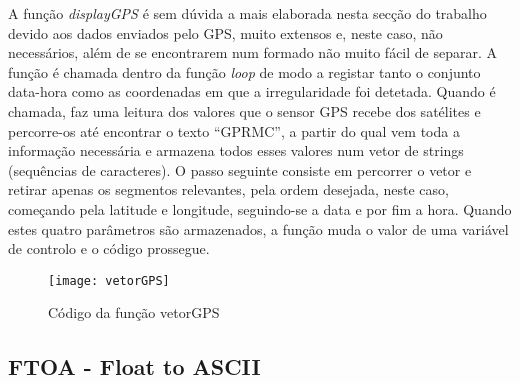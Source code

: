 A função \emph{displayGPS} é sem dúvida a mais elaborada nesta secção do trabalho devido aos dados enviados pelo GPS, muito extensos e, neste caso, não necessários, além de se encontrarem num formado não muito fácil de separar.
A função é chamada dentro da função \emph{loop} de modo a registar tanto o conjunto data-hora como as coordenadas em que a irregularidade foi detetada.
Quando é chamada, faz uma leitura dos valores que o sensor GPS recebe dos satélites e percorre-os até encontrar o texto ``GPRMC'', a partir do qual vem toda a informação necessária e armazena todos esses valores num vetor de strings (sequências de caracteres).
O passo seguinte consiste em percorrer o vetor e retirar apenas os segmentos relevantes, pela ordem desejada, neste caso, começando pela latitude e longitude, seguindo-se a data e por fim a hora.
Quando estes quatro parâmetros são armazenados, a função muda o valor de uma variável de controlo e o código prossegue.

\begin{figure}[hbtp]
	\centering
	\texttt{[image: vetorGPS]}
	\caption{Código da função vetorGPS}
	\label{fig:vetorGPS}
\end{figure}

\subsection{FTOA - Float to ASCII}
\label{sub:FTOA}

